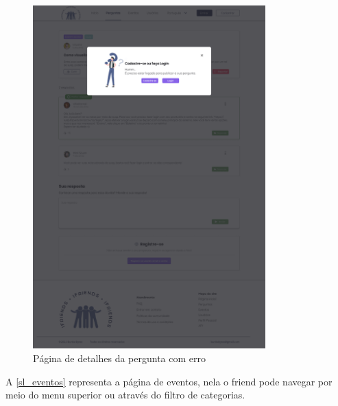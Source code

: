 \begin{figure}[htb]
\centering
\caption{\label{sl_detalhes_pergunta-erro} Página de detalhes da pergunta com erro}
\includegraphics[width=0.8\textwidth]{anexos/Imagens_Prototipo/sem_login/pergunta_respostas-erro.png}
\end{figure}
\FloatBarrier

A \autoref{sl_eventos} representa a página de eventos, nela o \gls{friend} pode navegar por meio do menu superior ou através do filtro de categorias. 

